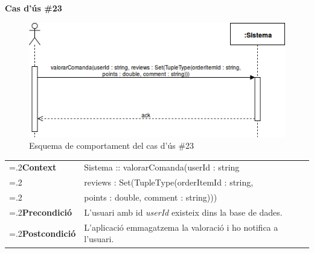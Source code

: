 \clearpage
\noindent\textbf{\large Cas d'ús \#23}\\
\begin{figure}[H]
\centering
\includegraphics[scale=0.6]{Figures/casdus_23.png}
\caption{Esquema de comportament del cas d'ús \#23}
\end{figure}
\begin{table}[h]
\noindent
\begin{tabularx}{\linewidth}{
>{\hsize=.2\hsize}X%
>{\hsize=0.8\hsize}X%
}
\textbf{Context} 		& Sistema :: valorarComanda(userId : string\\
						& reviews : Set(TupleType(orderItemId : string, \\
						& points : double, comment : string))) \\
\textbf{Precondició} 	& L'usuari amb id \textit{userId} existeix dins la base de dades. \\
\textbf{Postcondició}	& L'aplicació emmagatzema la valoració i ho notifica a l'usuari. \\
\end{tabularx}
\label{}
\end{table}

